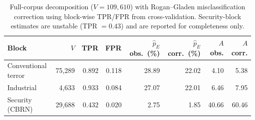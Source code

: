 \begin{table}[t]\centering\caption{Full-corpus decomposition ($V=109{,}610$) with Rogan--Gladen misclassification correction using block-wise TPR/FPR from cross-validation. Security-block estimates are unstable (TPR $=0.43$) and are reported for completeness only.}\label{tab:fullcorpus}
\begin{tabular}{lrrrrrrr}\toprule
Block & $V$ & TPR & FPR & $\hat p_E$ obs.\ (\%) & $\hat p_E$ corr.\ (\%) & $A$ obs. & $A$ corr. \\\midrule
Conventional terror & 75,289 & 0.892 & 0.118 & 28.89 & 22.02 & 4.10 & 5.38 \\
Industrial & 4,633 & 0.933 & 0.084 & 27.07 & 22.01 & 6.46 & 7.95 \\
Security (CBRN) & 29,688 & 0.432 & 0.020 & 2.75 & 1.85 & 40.66 & 60.46 \\
\bottomrule\end{tabular}\end{table}